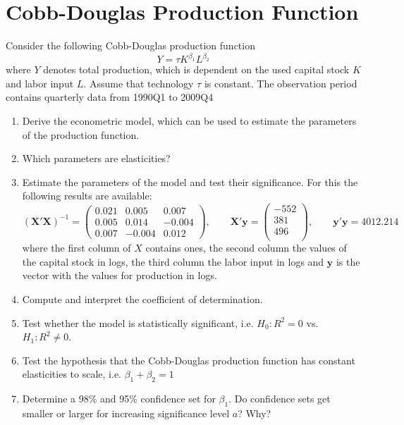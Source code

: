 \documentclass{article}
\begin{document}
\section{Cobb-Douglas Production Function}
Consider the following Cobb-Douglas production function
$$Y = \tau K^{\beta_1} L^{\beta_2}$$
where $Y$ denotes total production, which is dependent on the used capital stock $K$ and labor input $L$. Assume that technology $\tau$ is constant. The observation period contains quarterly data from 1990Q1 to 2009Q4
\begin{enumerate}[label=(\alph*)]
	\item Derive the econometric model, which can be used to estimate the parameters of the production function.
	\item Which parameters are elasticities?
	\item Estimate the parameters of the model and test their significance. For this the following results are available:
	$$(\mathbf{X}'\mathbf{X})^{-1}=
	\begin{pmatrix}
    0.021 &   0.005 &   0.007\\
	0.005 &   0.014 &  -0.004\\
	0.007 &  -0.004 &   0.012	
	\end{pmatrix}, \qquad 
	\mathbf{X}'\mathbf{y}=\begin{pmatrix}
	-552\\
	381\\
	496\\
	\end{pmatrix}, \qquad
	\mathbf{y}'\mathbf{y}=4012.214
	$$
	where the first column of $X$ contains ones, the second column the values of the capital stock in logs, the third column the labor input in logs and $\mathbf{y}$ is the vector with the values for production in logs.
	\item Compute and interpret the coefficient of determination.
	\item Test whether the model is statistically significant, i.e. $H_0: R^2=0$ vs. $H_1: R^2 \neq 0$.
	\item Test the hypothesis that the Cobb-Douglas production function has constant elasticities to scale, i.e. $\beta_1+\beta_2=1$
	\item Determine a 98\% and 95\% confidence set for $\beta_1$. Do confidence sets get smaller or larger for increasing significance level $a$? Why?
\end{enumerate}
\newpage
\end{document}
